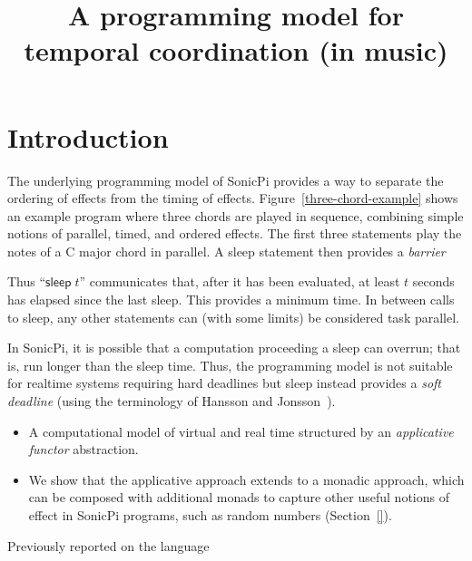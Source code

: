 \documentclass[preprint]{sigplanconf}
\title{A programming model for temporal coordination (in music)}
\newcommand{\note}[1]{{\color{blue}{#1}}}
\theoremstyle{definition}
\newcommand{\sleep}{\mathsf{sleep}\;}
\newcommand{\sleepOp}{\textsf{sleep}}
\newcommand{\lang}{SonicPi}
\begin{document}
\maketitle

\section{Introduction}
\label{sec:introduction}

\note{Introduction to SonicPi}

The underlying programming model of SonicPi provides a way to separate
the ordering of effects from the timing of
effects. Figure~\ref{three-chord-example} shows an example program
where three chords are played in sequence, combining simple notions of 
parallel, timed, and ordered effects. The first three statements play
the notes of a C major chord in parallel. A \sleepOp{} statement then 
provides a \emph{barrier}




Thus ``$\sleep{} t$'' communicates that, after it has been evaluated, at least 
$t$ seconds has elapsed since the last \sleepOp{}. This provides a minimum
time. In between calls to \sleepOp{}, any other statements can (with some limits)
be considered task parallel. 

In \lang{}, it is possible that a computation proceeding a \sleepOp{}
can overrun; that is, run longer than the sleep time.  Thus, the
programming model is not suitable for realtime systems requiring hard
deadlines but \sleepOp{} instead provides a \emph{soft deadline} (using
the terminology of Hansson and Jonsson~\cite{hansson1994logic}).


\begin{itemize}
\item A computational model of virtual and real time 
      structured by an \emph{applicative functor} abstraction.

\item We show that the applicative approach extends
      to a monadic approach, which can be composed with additional
      monads to capture other useful notions of effect in \lang{} programs,
      such as random numbers (Section~\ref{}).
\end{itemize}

Previously reported on the language~\cite{aaron2013sonic}
\end{document}
